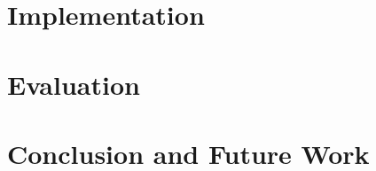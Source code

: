 \documentclass[12pt,a4paper,openright,twoside]{book}
\begin{document}
\chapter{Implementation}

\chapter{Evaluation}

\chapter{Conclusion and Future Work}

\backmatter

\nocite{*} %



\end{document}
